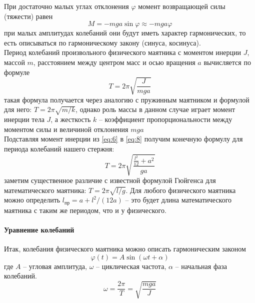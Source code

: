 \documentclass[a4paper,12pt]{article}
\begin{document}
	При достаточно малых углах отклонения $\varphi$ момент возвращающей силы (тяжести) равен
	\begin{equation}
		\label{eq:7}
		M=-mga\sin{\varphi}\approx-mga\varphi
	\end{equation}
	при малых амплитудах колебаний они будут иметь характер гармонических, то есть описываться по гармоническому закону (синуса, косинуса).\\
	\noindent
	Период колебаний произвольного физического маятника с моментом инерции $J$, массой $m$, расстоянием между центром масс и осью вращения $a$ вычисляется по формуле
	\begin{equation}
		\label{eq:8}
		T=2\pi\sqrt{\frac{J}{mga}}
	\end{equation}
	такая формула получается через аналогию с пружинным маятником и формулой для него: $T=2\pi\sqrt{m/k}$, однако роль массы в данном случае играет момент инерции тела $J$, а жесткость $k$ -- коэффициент пропорциональности между моментом силы и величиной отклонения $mga$\\
	\vspace{2mm}
	\noindent	Подставляя момент инерции из \eqref{eq:6} в \eqref{eq:8} получим конечную формулу для периода колебаний нашего стержня:
	\begin{equation}
		\label{eq:9}
		T=2\pi\sqrt{\frac{\frac{l^2}{12}+a^2}{ga}}
	\end{equation}
	заметим существенное различие с известной формулой Гюйгенса для математического маятника: $T=2\pi\sqrt{l/g}$. Для любого физического маятника можно определить $l_{\text{пр}}=a+l^2/(12a)$ -- это будет длина математического маятника с таким же периодом, что и у физического.\\
	\paragraph{Уравнение колебаний}
	\noindent
	Итак, колебания физического маятника можно описать гармоническим законом
	\begin{equation}
		\label{eq:10}
		\varphi(t)=A\sin({\omega t+\alpha})
	\end{equation} 
	где $A$ -- угловая амплитуда, $\omega$ -- циклическая частота, $\alpha$ -- начальная фаза колебаний.
	\[
		\omega = \frac{2\pi}{T}=\sqrt{\frac{mga}{J}}
	\]
	
\end{document}
